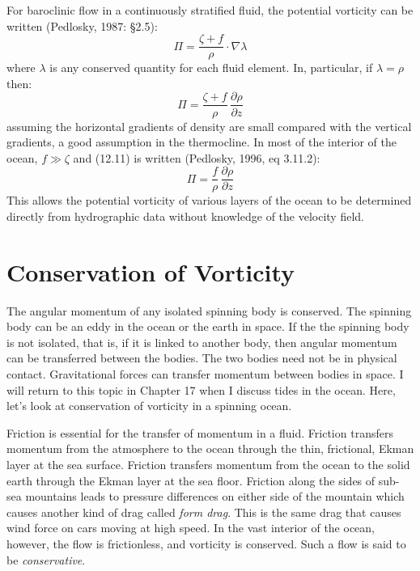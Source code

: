 For baroclinic flow in a continuously stratified fluid, the potential vorticity
can be written (Pedlosky, 1987: \S 2.5):
\begin{equation}
\Pi = \frac{\zeta + f}{\rho} \cdot \nabla \lambda
\end{equation}
where $\lambda$ is any conserved quantity for each fluid element. In, particular,
if $\lambda = \rho$ then:
\begin{equation}
\Pi = \frac{\zeta + f}{\rho}\,\frac{\partial{\rho}}{\partial{z}}
\end{equation}
assuming the horizontal gradients of density are small compared
with the vertical gradients, a good assumption in the thermocline. In most
of the interior of the ocean, $f \gg \zeta$ and (12.11) is written (Pedlosky, 1996, eq
3.11.2):
\begin{equation}
\Pi = \frac{f}{\rho}\,\frac{\partial{\rho}}{\partial{z}}
\end{equation}
This allows the potential vorticity of various layers of the ocean to be
determined directly from hydrographic data
without knowledge of the velocity field.

\section{Conservation of Vorticity}
The angular momentum of any isolated spinning body is
conserved. The spinning body can be an eddy in the ocean or the earth in space. If the
the spinning body is not isolated, that is, if it is linked to another body, then
angular momentum can be transferred between the bodies. The two bodies need not be in
physical contact. Gravitational forces can transfer momentum between bodies in space.
I will return to this topic in Chapter 17 when I discuss tides in the ocean. Here,
let's look at conservation of vorticity in a spinning ocean.

Friction is essential for the transfer of momentum in a fluid. Friction transfers
momentum from the atmosphere to the ocean through the thin, frictional, Ekman layer at
the sea surface. Friction transfers momentum from the ocean to the
solid earth through the Ekman layer at the sea floor. Friction along the sides of
sub-sea mountains leads to pressure differences on either side of the mountain which
causes another kind of drag called \textit{form drag}. This is the same drag that causes wind force on
cars moving at high speed. In the vast interior of the ocean, however, the flow is
frictionless, and vorticity is conserved. Such a flow is said to be
\textit{conservative}.

